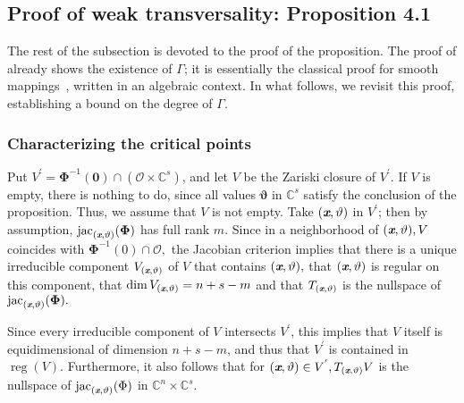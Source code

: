 \documentclass[a4paper]{article}
\def\sO{\mathscr{O}}
\def\thetab{\bm{\vartheta}}
\def\xb{\textit{\textbf{x}}}
\def\vt{\vartheta}
\DeclareMathOperator{\jac}{jac}
\DeclareMathOperator{\reg}{reg}
\def\dt{s}
\def\C{\mathbb{C}}
\begin{document}
\subsection{Proof of weak transversality: Proposition 4.1}
The rest of the subsection is devoted to the proof of the proposition.
The proof of \cite[Theorem B.3]{TWT} already shows the existence of
$\Gamma$; it is essentially the classical proof for smooth
mappings~\cite[Section~3.7]{demazure2000bifurcations}, written in an
algebraic context. In what follows, we revisit this proof,
establishing a bound on the degree of $\Gamma$.



\subsubsection{Characterizing the critical points}
    Put $V^{'} = \bm\Phi^{-1}(\bm 0) \cap (\sO \times \C^s)$, and let $V$ be the Zariski closure of $V^{'}.$ If $V$ is empty, there is nothing to do, since all values $\thetab$ in $\C^\dt$ satisfy the conclusion of the proposition. Thus, we assume that $V$ is not empty. Take $(\xb, \vt)$ in $V^{'}$; then by assumption, $\jac_{(\xb,\vt)}({\bm \Phi})$ has full rank $m$. Since in a neighborhood of $(\xb,\vt), V$ coincides with ${\bm \Phi}^{-1}(0) \cap \sO,$ the Jacobian criterion implies that there is a unique irreducible component $V_{(\xb,\vt)}$ of $V$ that contains $(\xb,\vt),$ that $(\xb,\vt)$ is regular on this component, that $\dim V_{(\xb,\vt)}=n+s-m$ and that $T_{(\xb,\vt)}$ is the nullspace of $\jac_{(\xb,\vt)}({\bm \Phi}).$
    
    Since every irreducible component of $V$ intersects $V^{'}$, this implies that $V$ itself is equidimensional of dimension $n+s-m$, and thus that $V^{'}$ is contained in $\reg (V)$. Furthermore, it also follows that for $(\xb,\vt) \in V^{'}, T_{(\xb,\vt)}V$ is the nullspace of $\jac_{(\xb,\vt)}(\Phi)$ in $\C^n \times \C^s.$  
    
\end{document}

